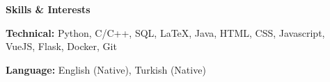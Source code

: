 \documentclass[11pt]{article}
\begin{document}


\begin{center}
    \textbf{Skills \& Interests}
\end{center}

\textbf{Technical:} Python, C/C++, SQL, LaTeX, Java, HTML, CSS, Javascript, VueJS, Flask, Docker, Git

\textbf{Language:} English (Native), Turkish (Native)

\end{document}
